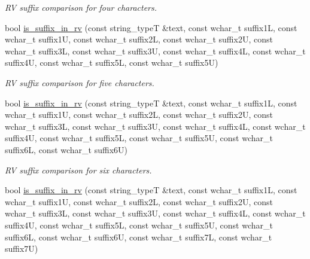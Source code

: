 \begin{DoxyCompactItemize}
\begin{DoxyCompactList}\small\item\em R\+V suffix comparison for four characters. \end{DoxyCompactList}\item 
\hypertarget{classstemming_1_1stem_a99ef9b0e80da18c39cc0206a666bd4b1}{bool \hyperlink{classstemming_1_1stem_a99ef9b0e80da18c39cc0206a666bd4b1}{is\+\_\+suffix\+\_\+in\+\_\+rv} (const string\+\_\+type\+T \&text, const wchar\+\_\+t suffix1\+L, const wchar\+\_\+t suffix1\+U, const wchar\+\_\+t suffix2\+L, const wchar\+\_\+t suffix2\+U, const wchar\+\_\+t suffix3\+L, const wchar\+\_\+t suffix3\+U, const wchar\+\_\+t suffix4\+L, const wchar\+\_\+t suffix4\+U, const wchar\+\_\+t suffix5\+L, const wchar\+\_\+t suffix5\+U)}\label{classstemming_1_1stem_a99ef9b0e80da18c39cc0206a666bd4b1}

\begin{DoxyCompactList}\small\item\em R\+V suffix comparison for five characters. \end{DoxyCompactList}\item 
\hypertarget{classstemming_1_1stem_a527b081fee02f191713a50dbc396f986}{bool \hyperlink{classstemming_1_1stem_a527b081fee02f191713a50dbc396f986}{is\+\_\+suffix\+\_\+in\+\_\+rv} (const string\+\_\+type\+T \&text, const wchar\+\_\+t suffix1\+L, const wchar\+\_\+t suffix1\+U, const wchar\+\_\+t suffix2\+L, const wchar\+\_\+t suffix2\+U, const wchar\+\_\+t suffix3\+L, const wchar\+\_\+t suffix3\+U, const wchar\+\_\+t suffix4\+L, const wchar\+\_\+t suffix4\+U, const wchar\+\_\+t suffix5\+L, const wchar\+\_\+t suffix5\+U, const wchar\+\_\+t suffix6\+L, const wchar\+\_\+t suffix6\+U)}\label{classstemming_1_1stem_a527b081fee02f191713a50dbc396f986}

\begin{DoxyCompactList}\small\item\em R\+V suffix comparison for six characters. \end{DoxyCompactList}\item 
\hypertarget{classstemming_1_1stem_abd6431b54fc5175c29809c627c44a587}{bool \hyperlink{classstemming_1_1stem_abd6431b54fc5175c29809c627c44a587}{is\+\_\+suffix\+\_\+in\+\_\+rv} (const string\+\_\+type\+T \&text, const wchar\+\_\+t suffix1\+L, const wchar\+\_\+t suffix1\+U, const wchar\+\_\+t suffix2\+L, const wchar\+\_\+t suffix2\+U, const wchar\+\_\+t suffix3\+L, const wchar\+\_\+t suffix3\+U, const wchar\+\_\+t suffix4\+L, const wchar\+\_\+t suffix4\+U, const wchar\+\_\+t suffix5\+L, const wchar\+\_\+t suffix5\+U, const wchar\+\_\+t suffix6\+L, const wchar\+\_\+t suffix6\+U, const wchar\+\_\+t suffix7\+L, const wchar\+\_\+t suffix7\+U)}\label{classstemming_1_1stem_abd6431b54fc5175c29809c627c44a587}


\end{DoxyCompactItemize}
